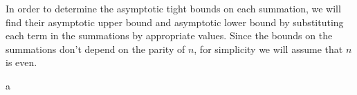 In order to determine the asymptotic tight bounds on each summation, we will find their asymptotic upper bound and asymptotic lower bound by substituting each term in the summations by appropriate values.
Since the bounds on the summations don't depend on the parity of $n$, for simplicity we will assume that $n$ is even.

{a}
